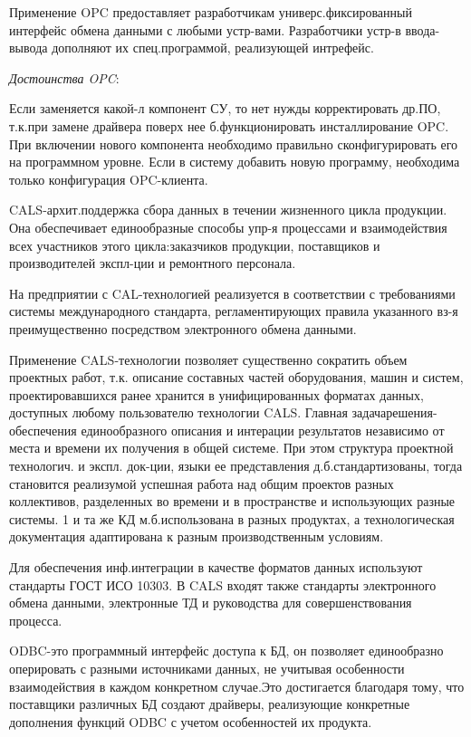 \documentclass[unicode, 12pt, a4paper, oneside]{article}
\begin{document}
Применение OPC предоставляет разработчикам универс.фиксированный интерфейс обмена данными с любыми устр-вами. Разработчики устр-в ввода-вывода дополняют их спец.программой, реализующей интрефейс.

\textit{Достоинства OPC}:

Если заменяется какой-л компонент СУ, то нет нужды корректировать др.ПО, т.к.при замене драйвера поверх нее б.функционировать инсталлирование OPC. При включении нового компонента необходимо правильно сконфигурировать его на программном уровне. Если в систему добавить новую программу, необходима только конфигурация OPC-клиента.

CALS-архит.поддержка сбора данных в течении жизненного цикла продукции. Она обеспечивает единообразные способы упр-я процессами и взаимодействия всех участников этого цикла:заказчиков продукции, поставщиков и производителей экспл-ции и ремонтного персонала.

На предприятии с CAL-технологией реализуется в соответствии с требованиями системы международного стандарта, регламентирующих правила указанного вз-я преимущественно посредством электронного обмена данными.

Применение CALS-технологии позволяет существенно сократить объем проектных работ, т.к. описание составных частей оборудования, машин и систем, проектировавшихся ранее хранится в унифицированных форматах данных, доступных любому пользователю технологии CALS. Главная задачарешения-обеспечения единообразного описания и интерации результатов независимо от места и времени их получения в общей системе. При этом структура проектной технологич. и экспл. док-ции, языки ее представления д.б.стандартизованы, тогда становится реализумой успешная работа над общим проектов разных коллективов, разделенных во времени и в пространстве и использующих разные системы. 1 и та же КД м.б.использована в разных продуктах, а технологическая документация адаптирована к разным производственным условиям.

Для обеспечения инф.интеграции в качестве форматов данных используют стандарты ГОСТ ИСО 10303. В CALS входят также стандарты электронного обмена данными, электронные ТД и руководства для совершенствования процесса.

ODBC-это программный интерфейс доступа к БД, он позволяет единообразно оперировать с разными источниками данных, не учитывая особенности взаимодействия в каждом конкретном случае.Это достигается благодаря тому, что поставщики различных БД создают драйверы, реализующие конкретные дополнения функций ODBC с учетом особенностей их продукта.
\end{document}
